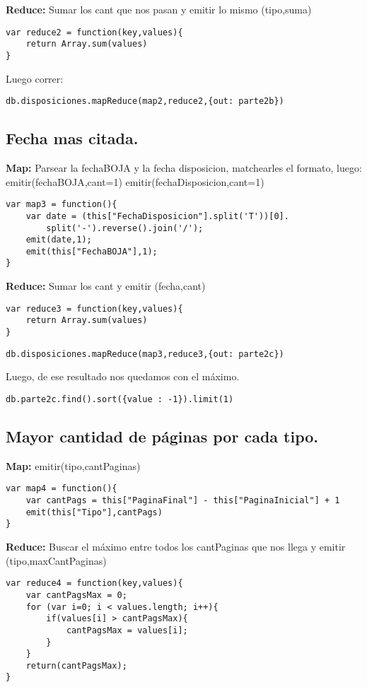 \textbf{Reduce:}
Sumar los cant que nos pasan y emitir lo mismo (tipo,suma)
\begin{lstlisting}
var reduce2 = function(key,values){
	return Array.sum(values)
}
\end{lstlisting}
Luego correr: 
\begin{lstlisting}
db.disposiciones.mapReduce(map2,reduce2,{out: parte2b})
\end{lstlisting}

\subsection{Fecha mas citada.}

\textbf{Map:}
Parsear la fechaBOJA y la fecha disposicion, matchearles el formato, luego:
emitir(fechaBOJA,cant=1)
emitir(fechaDisposicion,cant=1)

\begin{lstlisting}
var map3 = function(){
	var date = (this["FechaDisposicion"].split('T'))[0].
		split('-').reverse().join('/');
	emit(date,1);
	emit(this["FechaBOJA"],1);
}
\end{lstlisting}
\textbf{Reduce:}
Sumar los cant y emitir (fecha,cant)
\begin{lstlisting}
var reduce3 = function(key,values){
	return Array.sum(values)
}
\end{lstlisting}
\begin{lstlisting}
db.disposiciones.mapReduce(map3,reduce3,{out: parte2c})
\end{lstlisting}
Luego, de ese resultado nos quedamos con el máximo.
\begin{lstlisting}
db.parte2c.find().sort({value : -1}).limit(1)
\end{lstlisting}

\subsection{Mayor cantidad de páginas por cada tipo.}

\textbf{Map:} emitir(tipo,cantPaginas)
\begin{lstlisting}
var map4 = function(){
	var cantPags = this["PaginaFinal"] - this["PaginaInicial"] + 1
	emit(this["Tipo"],cantPags)
}
\end{lstlisting}
\textbf{Reduce:}
Buscar el máximo entre todos los cantPaginas que nos llega y emitir (tipo,maxCantPaginas)
\begin{lstlisting}
var reduce4 = function(key,values){
	var cantPagsMax = 0;
	for (var i=0; i < values.length; i++){
		if(values[i] > cantPagsMax){
			cantPagsMax = values[i];
		}
	}
	return(cantPagsMax);
}
\end{lstlisting}